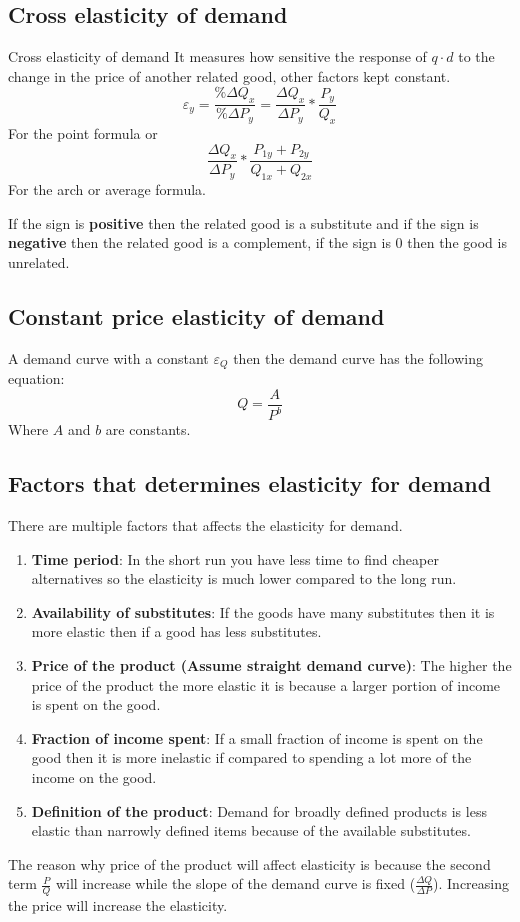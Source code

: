 \documentclass[../ECON-281-Notes.tex]{subfiles}
\begin{document}
\subsection{Cross elasticity of demand}
\begin{DndSidebar}[color=PhbLightGreen]{Cross elasticity of demand}
  It measures how sensitive the response of $q\cdot d$ to the change in the price of another related good, other factors kept constant.
  \[ 
  \varepsilon_{y} = \frac{\%\Delta Q_x}{\%\Delta P_y} = \frac{\Delta Q_x}{\Delta P_y} * \frac{P_y}{Q_x} 
  \]
  For the point formula or 
  \[ 
    \frac{\Delta Q_x}{\Delta P_y} * \frac{P_{1y} + P_{2y}}{Q_{1x} + Q_{2x}} 
  \] 
  For the arch or average formula.
  
  If the sign is \textbf{positive} then the related good is a substitute and if the sign is \textbf{negative} then the related good is a complement, if the sign is $0$ then the good is unrelated.
\end{DndSidebar}

  
\subsection{Constant price elasticity of demand}
A demand curve with a constant $\varepsilon_{Q}$ then the demand curve has the following equation:
\[ 
Q = \frac{A}{P^{b}} 
\] 
Where $A$ and $b$ are constants.

\subsection{Factors that determines elasticity for demand}
There are multiple factors that affects the elasticity for demand.
\begin{enumerate}
  \item \textbf{Time period}: In the short run you have less time to find cheaper alternatives so the elasticity is much lower compared to the long run.
  \item \textbf{Availability of substitutes}: If the goods have many substitutes then it is more elastic then if a good has less substitutes.
  \item \textbf{Price of the product (Assume straight demand curve)}: The higher the price of the product the more elastic it is because a larger portion of income is spent on the good.
  \item \textbf{Fraction of income spent}: If a small fraction of income is spent on the good then it is more inelastic if compared to spending a lot more of the income on the good.
  \item \textbf{Definition of the product}: Demand for broadly defined products is less elastic than narrowly defined items because of the available substitutes. 
\end{enumerate}
\begin{Note}
  The reason why price of the product will affect elasticity is because the second term $\frac{P}{Q}$ will increase while the slope of the demand curve is fixed ($\frac{\Delta Q}{\Delta P}$).
  Increasing the price will increase the elasticity.
\end{Note}
\end{document}
